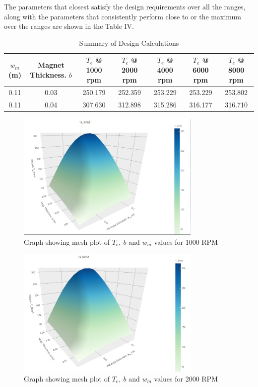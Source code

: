 \documentclass[lettersize,journal]{IEEEtran}
\begin{document}
The parameters that closest satisfy the design requirements over all the ranges, along with the parameters that consistently perform close to or the maximum over the ranges are shown in the Table IV.

\begin{table}[t]
\renewcommand{\arraystretch}{1.3}
\caption{Summary of Design Calculations}
\label{table_example}
\centering
\begin{tabular}{c c c c c c c}
\hline
\bfseries $w_m$(m) & \bfseries Magnet Thickness. $b$ & \bfseries $T_e$ @ 1000 rpm & \bfseries $T_e$ @ 2000 rpm & \bfseries $T_e$ @ 4000 rpm & \bfseries $T_e$ @ 6000 rpm & \bfseries $T_e$ @ 8000 rpm\\
\hline
0.11 & 0.03 & 250.179 & 252.359 & 253.229 & 253.229 & 253.802 \\
\hline
0.11 & 0.04 & 307.630 & 312.898 & 315.286 & 316.177 & 316.710 \\
\hline
\end{tabular}
\end{table}

\begin{figure}[!htbp]
\centering
\centering
\includegraphics[width=3.5in]{images/mTC1k.png}
\caption{Graph showing mesh plot of $T_e,\ b$ and $w_m$ values for 1000 RPM}
\label{fig3}
\end{figure}
\FloatBarrier

\begin{figure}[!htbp]
\centering
\includegraphics[width=3.5in]{images/mTC2k.png}
\caption{Graph showing mesh plot of $T_e,\ b$ and $w_m$ values for 2000 RPM}
\label{fig4}
\end{figure}
\FloatBarrier
\end{document}
